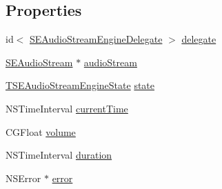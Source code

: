 \subsection*{Properties}
\begin{DoxyCompactItemize}
\item 
id$<$ \hyperlink{protocol_s_e_audio_stream_engine_delegate-p}{S\-E\-Audio\-Stream\-Engine\-Delegate} $>$ \hyperlink{interface_s_e_audio_stream_engine_a83d462c8d145871aff485cc4dec5f9a5}{delegate}
\item 
\hyperlink{interface_s_e_audio_stream}{S\-E\-Audio\-Stream} $\ast$ \hyperlink{interface_s_e_audio_stream_engine_abe299880b85d0e7df2a9a2c6b6307dc3}{audio\-Stream}
\item 
\hyperlink{_s_e_audio_stream_engine_8h_a6eabe41a5616eddfad154f7259ccdc27}{T\-S\-E\-Audio\-Stream\-Engine\-State} \hyperlink{interface_s_e_audio_stream_engine_a124d47656b0b46ef4ec62ead90d17c47}{state}
\item 
N\-S\-Time\-Interval \hyperlink{interface_s_e_audio_stream_engine_ad7b5146644d4e96003f18756c4de975e}{current\-Time}
\item 
C\-G\-Float \hyperlink{interface_s_e_audio_stream_engine_aaddfc5a5f1cff2b0136665bc52e89ab1}{volume}
\item 
N\-S\-Time\-Interval \hyperlink{interface_s_e_audio_stream_engine_a9b03bb707f1b187e2d32e540f80a5dc1}{duration}
\item 
N\-S\-Error $\ast$ \hyperlink{interface_s_e_audio_stream_engine_a698b085efa2bb9de2fd2c24e98bf33cf}{error}
\end{DoxyCompactItemize}


